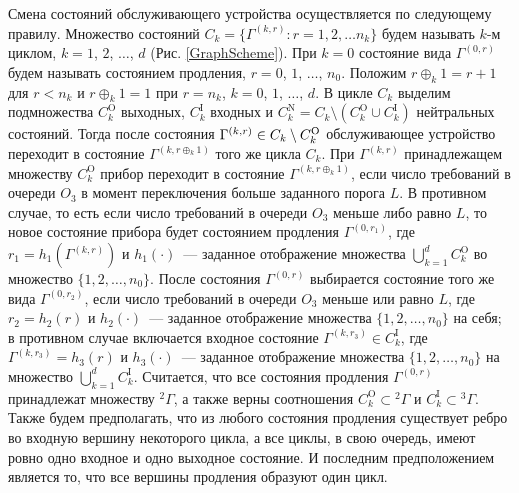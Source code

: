 \documentclass[a4paper,12pt,russian]{extarticle}
\begin{document}
Смена состояний обслуживающего устройства осуществляется по следующему правилу. Множество состояний $C_k = \{\Gamma^{(k,r)} \colon r=1,2,\ldots n_k\}$ будем называть $k$-м циклом, $k=1$, $2$, $\ldots$, $d$ (Рис. \ref{GraphScheme}). При $k=0$ состояние вида $\Gamma^{(0,r)}$ будем называть состоянием продления, $r=0$, $1$, $\ldots$, $n_0$. Положим $r \oplus_k 1 = r+1$ для $r<n_k$ и $r \oplus_k 1 = 1$ при $r=n_k$, $k = 0$, $1$, $\ldots$, $d$. В цикле $C_k$ выделим подмножества $C_k^{\mathrm{O}}$ выходных, $C_k^{\mathrm{I}}$ входных и $C_k^{\mathrm{N}} = C_k \setminus (C_k^{\mathrm{O}} \cup C_k^{\mathrm{I}})$ нейтральных состояний. Тогда после состояния $\Gamma^{(k,r)} \hm\in C_k\setminus C_k^{\mathrm{O}}$ обслуживающее устройство переходит в состояние $\Gamma^{(k,r \oplus_k 1)}$ того же цикла $C_k$. При $\Gamma^{(k,r)}$ принадлежащем множеству $C_k^{\mathrm{O}}$ прибор переходит в состояние $\Gamma^{(k,r \oplus_k 1)}$, если число требований в очереди $O_3$ в момент переключения больше заданного порога $L$. В противном случае, то есть если число требований в очереди $O_3$ меньше либо равно $L$, то новое состояние прибора будет состоянием продления $\Gamma^{(0,r_1)}$, где $r_1=h_1(\Gamma^{(k,r)})$ и $h_1(\cdot)$~--- заданное отображение множества $\bigcup\limits_{k=1}^d C_k^{\mathrm{O}}$ во множество $\{1,2,\ldots, n_0\}$. После состояния $\Gamma^{(0,r)}$ выбирается состояние того же вида $\Gamma^{(0,r_2)}$, если число требований в очереди $O_3$ меньше или равно $L$, где $r_2=h_2(r)$ и $h_2(\cdot)$~--- заданное отображение множества $\{1,2, \ldots, n_0\}$ на себя; в противном случае включается входное состояние $\Gamma^{(k,r_3)} \in C_k^{\mathrm{I}}$, где $\Gamma^{(k,r_3)}=h_3(r)$ и $h_3(\cdot)$~--- заданное отображение множества $\{1,2, \ldots, n_0\}$ на множество  $\bigcup\limits_{k=1}^d C_k^{\mathrm{I}}$. Считается, что все состояния продления $\Gamma^{(0,r)}$ принадлежат множеству ${}^2 \Gamma$, а также верны соотношения $C_k^\mathrm{O}\subset {}^2 \Gamma$ и $C_k^\mathrm{I}\subset {}^3 \Gamma$. Также будем предполагать, что из любого состояния продления существует ребро во входную вершину некоторого цикла, а все циклы, в свою очередь, имеют ровно одно входное и одно выходное состояние. И последним предположением является то, что все вершины продления образуют один цикл.
\end{document}
